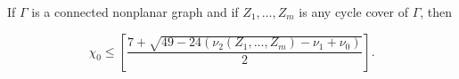If $\Gamma$ is a connected nonplanar graph and if $Z_1, \ldots, Z_m$ is any cycle cover of $\Gamma$, then

$$\chi_0 \leq \left[ \frac{7 + \sqrt{49 - 24(\nu_2(Z_1, \ldots, Z_m) - \nu_1 + \nu_0)}}{2} \right].$$
